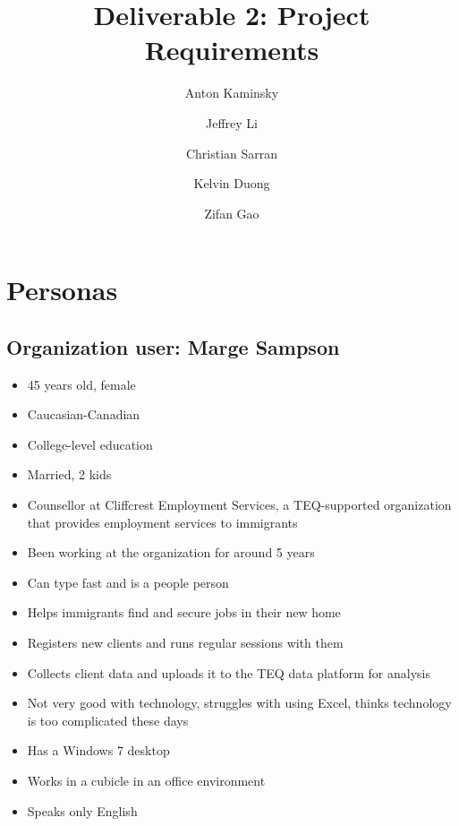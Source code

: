 \documentclass[]{scrreprt}
\title{Deliverable 2: Project Requirements}
\author{Anton Kaminsky \and Jeffrey Li \and Christian Sarran \and Kelvin Duong \and Zifan Gao}
\begin{document}
\maketitle
\tableofcontents
\section{Personas}
\subsection{Organization user: Marge Sampson}
\begin{itemize}
	\item 45 years old, female
	\item Caucasian-Canadian
	\item College-level education
	\item Married, 2 kids
	\item Counsellor at Cliffcrest Employment Services, a TEQ-supported organization that provides employment services to immigrants
	\item Been working at the organization for around 5 years
	\item Can type fast and is a people person
	\item Helps immigrants find and secure jobs in their new home
	\item Registers new clients and runs regular sessions with them
	\item Collects client data and uploads it to the TEQ data platform for analysis
	\item Not very good with technology, struggles with using Excel, thinks technology is too complicated these days
	\item Has a Windows 7 desktop
	\item Works in a cubicle in an office environment
	\item Speaks only English
\end{itemize}
\end{document}

